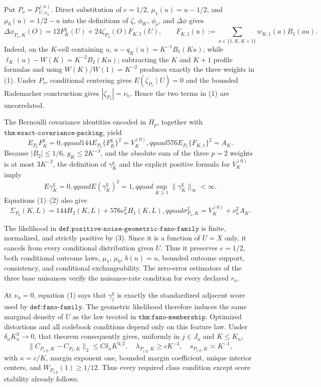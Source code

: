Put \(P_\nu=P_{U,\nu_n}^{(n)}\).  Direct substitution of \(e=1/2\), \(\mu_1(u)=u-1/2\), and \(\mu_0(u)=1/2-u\) into the definitions of \(\zeta\), \(\phi_W\), \(\phi_\rho\), and \(\Delta\phi\) gives
\[
 \Delta\phi_{P_\nu,K}(O)
 =12F_K^{\mathrm g}(U)+24\zeta_{P_\nu}(O)F_{K,1}(U),
 \qquad
 F_{K,1}(u):=\sum_{a\in\{1,K,K+1\}}w_{K,1}(a)B_1(au).                 \tag{1}
\]
Indeed, on the \(K\)-cell containing \(u\), \(u-q_K(u)=K^{-1}B_1(Ku)\), while \(\ell_K(u)-W(K)=K^{-2}B_2(Ku)\); subtracting the \(K\) and \(K+1\) profile formulas and using \(W(K)/W(1)=K^{-2}\) produces exactly the three weights in (1).  Under \(P_\nu\), conditional centering gives \(E(\zeta_{P_\nu}\mid U)=0\) and the bounded Rademacher construction gives \(|\zeta_{P_\nu}|=\nu_n\).  Hence the two terms in (1) are uncorrelated.

The Bernoulli covariance identities encoded in \(H_p\), together with \(\texttt{thm:exact-covariance-packing}\), yield
\[
 E_{P_\nu}F_K^{\mathrm g}=0,qquad
 144E_{P_\nu}\{F_K^{\mathrm g}\}^2=V_K^{(0)},qquad
 576E_{P_\nu}\{F_{K,1}\}^2=A_K.                                      \tag{2}
\]
Because \(|B_2|\leq1/6\), \(g_K\leq2K^{-3}\), and the absolute sum of the three \(p=2\) weights is at most \(3K^{-2}\), the definition of \(\gamma_K^{\mathrm g}\) and the explicit positive formula for \(V_K^{(0)}\) imply
\[
 E\gamma_K^{\mathrm g}=0,qquad E(\gamma_K^{\mathrm g})^2=1,qquad
 \sup_{K\geq1}\|\gamma_K^{\mathrm g}\|_\infty<\infty.                \tag{3}
\]
Equations (1)--(2) also give
\[
 \Sigma_{P_\nu}(K,L)=144H_2(K,L)+576\nu_n^2H_1(K,L),qquad
 \sigma_{P_\nu,K}^2=V_K^{(0)}+\nu_n^2A_K.                              \tag{4}
\]

The likelihood in \(\texttt{def:positive-noise-geometric-fano-family}\) is finite, normalized, and strictly positive by (3).  Since it is a function of \(U=X\) only, it cancels from every conditional distribution given \(U\).  Thus it preserves \(e=1/2\), both conditional outcome laws, \(\mu_1\), \(\mu_0\), \(b(u)=u\), bounded outcome support, consistency, and conditional exchangeability.  The zero-error estimators of the three base nuisances verify the nuisance-rate condition for every declared \(r_n\).

At \(\nu_n=0\), equation (1) says that \(\gamma_j^{\mathrm g}\) is exactly the standardized adjacent score used by \(\texttt{def:fano-family}\).  The geometric likelihood therefore induces the same marginal density of \(U\) as the law treated in \(\texttt{thm:fano-membership}\).  Optimized distortions and all codebook conditions depend only on this feature law.  Under \(\delta_nK_n^3\to0\), that theorem consequently gives, uniformly in \(j\in J_n\) and \(K\leq K_n\),
\[
 \|C_{P_{j,\mathrm g},K}-C_{P_\nu,K}\|_2\leq C\delta_nK^{3/2},\quad
 \lambda_{P_{j,\mathrm g},K}\geq cK^{-3},\quad
 s_{P_{j,\mathrm g},K}\asymp K^{-1},                                  \tag{5}
\]
with \(\kappa=c/K\), margin exponent one, bounded margin coefficient, unique interior centers, and \(W_{P_{j,\mathrm g}}(1)\geq1/12\).  Thus every required class condition except score stability already follows.

